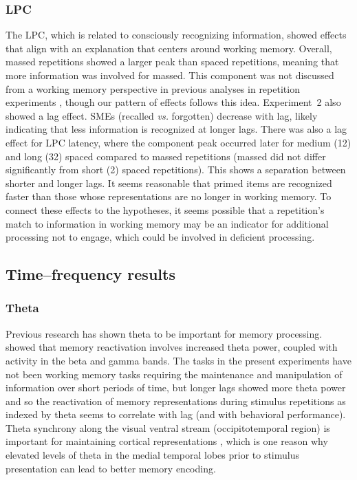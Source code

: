 \subsubsection{LPC}



The LPC, which is related to consciously recognizing information, showed effects that align with an explanation that centers around working memory.  Overall, massed repetitions showed a larger peak than spaced repetitions, meaning that more information was involved for massed.  This component was not discussed from a working memory perspective in previous analyses in repetition experiments \cite[rather, they described it as ``template matching'']{OlicEtal2000,VanSEtal2007}, though our pattern of effects follows this idea.
Experiment~2 also showed a lag effect.  SMEs (recalled \textit{vs.} forgotten) decrease with lag, likely indicating that less information is recognized at longer lags.
There was also a lag effect for LPC latency, where the component peak occurred later for medium (12) and long (32) spaced compared to massed repetitions (massed did not differ significantly from short (2) spaced repetitions).  This shows a separation between shorter and longer lags.  It seems reasonable that primed items are recognized faster than those whose representations are no longer in working memory.  To connect these effects to the hypotheses, it seems possible that a repetition's match to information in working memory may be an indicator for additional processing not to engage, which could be involved in deficient processing.

\subsection{Time--frequency results}

\subsubsection{Theta}

Previous research has shown theta to be important for memory processing.
 showed that memory reactivation involves increased theta power, coupled with activity in the beta and gamma bands.
The tasks in the present experiments have not been working memory tasks requiring the maintenance and manipulation of information over short periods of time, but longer lags showed more theta power and so the reactivation of memory representations during stimulus repetitions as indexed by theta seems to correlate with lag (and with behavioral performance).
Theta synchrony along the visual ventral stream (occipitotemporal region) is important for maintaining cortical representations \cite{DuzeEtal2010}, which is one reason why elevated levels of theta in the medial temporal lobes prior to stimulus presentation can lead to better memory encoding.

